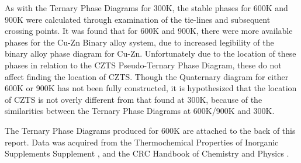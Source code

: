 As with the Ternary Phase Diagrams for 300K, the stable phases for 600K and 900K were calculated through examination of the tie-lines and subsequent crossing points. It was found that for 600K and 900K, there were more available phases for the Cu-Zn Binary alloy system, due to increased legibility of the binary alloy phase diagram for Cu-Zn. Unfortunately due to the location of these phases in relation to the CZTS Pseudo-Ternary Phase Diagram, these do not affect finding the location of CZTS. Though the Quaternary diagram for either 600K or 900K has not been fully constructed, it is hypothesized that the location of CZTS is not overly different from that found at 300K, because of the similarities between the Ternary Phase Diagrams at 600K/900K and 300K.

The Ternary Phase Diagrams produced for 600K are attached to the back of this report.
Data was acquired from the Thermochemical Properties of Inorganic Supplements Supplement \citep{barin_thermochemical_1977}, and the CRC Handbook of Chemistry and Physics \citep{haynes_crc_2013}.